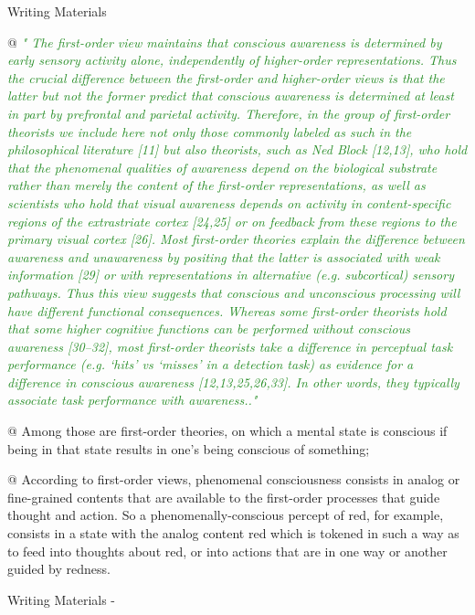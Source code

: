 \documentclass[utf8]{article}
\newenvironment{WritingMaterials} %
    	{
            \begin{tcolorbox}[enhanced,
                title=-,
                size=small,
                colbacktitle=Aquamarine,
                drop fuzzy shadow,
                fontupper=\small,
                boxrule=0.4pt,
                colback=Aquamarine!10!white,
                sharp corners]
                Writing Materials
            \end{tcolorbox}
            \begin{easylist}[itemize]
    	}
    	{
            \end{easylist}  
            \begin{tcolorbox}[enhanced,
                halign=flush right,
                halign title=right,
                size=small,
                colbacktitle=Aquamarine,
                drop fuzzy shadow,
                fontupper=\small,
                boxrule=0.4pt,
                colback=Aquamarine,
                colupper=White,
                sharp corners]
                Writing Materials -
            \end{tcolorbox}        
    	}
\newcommand{\rewrite}[1]{\textcolor{ForestGreen}{\textit{"#1"}}\newline}
\newcommand{\rlend}{\cbend}
\begin{document}
		
			\begin{WritingMaterials}
				@ \rewrite{
					The ﬁrst-order view maintains that conscious awareness is determined by early sensory activity alone, independently of higher-order representations. Thus the crucial difference between the ﬁrst-order and higher-order views is that the latter but not the former predict that conscious awareness is determined at least in part by prefrontal and parietal activity. Therefore, in the group of ﬁrst-order theorists we include here not only those commonly labeled as such in the philosophical literature [11] but also theorists, such as Ned Block [12,13], who hold that the phenomenal qualities of awareness depend on the biological substrate rather than merely the content of the ﬁrst-order representations, as well as scientists who hold that visual awareness depends on activity in content-speciﬁc regions of the extrastriate cortex [24,25] or on feedback from these regions to the primary visual cortex [26]. Most ﬁrst-order theories explain the difference between awareness and unawareness by positing that the latter is associated with weak information [29] or with representations in alternative (e.g. subcortical) sensory pathways. Thus this view suggests that conscious and unconscious processing will have different functional consequences. Whereas some ﬁrst-order theorists hold that some higher cognitive functions can be performed without conscious awareness [30–32], most ﬁrst-order theorists take a difference in perceptual task performance (e.g. ‘hits’ vs ‘misses’ in a detection task) as evidence for a difference in conscious awareness [12,13,25,26,33]. In other words, they typically associate task performance with awareness..} \cite{lau2011empirical}

				@ Among those are first-order theories, on which a mental state is conscious if being in that state results in one's being conscious of something;


				@  According to first-order views, phenomenal consciousness consists in analog or fine-grained contents that are available to the first-order processes that guide thought and action. So a phenomenally-conscious percept of red, for example, consists in a state with the analog content red which is tokened in such a way as to feed into thoughts about red, or into actions that are in one way or another guided by redness.

			\end{WritingMaterials}

\rlend
\end{document}
